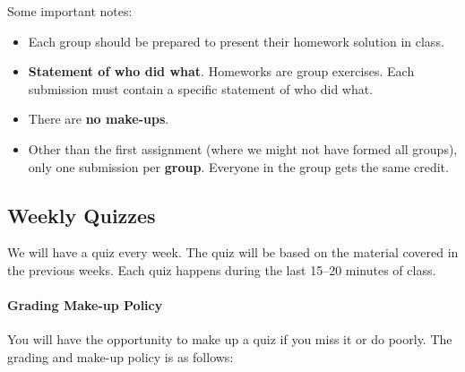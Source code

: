\documentclass[11pt]{article}
\begin{document}
Some important notes:

\begin{itemize}
\item
Each group should be prepared to present their homework solution in
class.

\item
  \textbf{Statement of who did what}. Homeworks are group exercises.
  Each submission must contain a specific statement of who did what.
\item
  There are \textbf{no make-ups}.
\item
  Other than the first assignment (where we might not have formed all
  groups), only one submission per \textbf{\textbf{group}}. Everyone in
  the group gets the same credit.
\end{itemize}

\subsection{Weekly Quizzes}\label{weekly-quizzes}

We will have a quiz every week. The quiz will be based on the material covered in the previous weeks.
Each quiz happens during the last 15--20 minutes of class.


\paragraph{Grading Make-up Policy} You will have the opportunity to make up a quiz if you miss it or do poorly. The grading and make-up policy is as follows:
\end{document}

